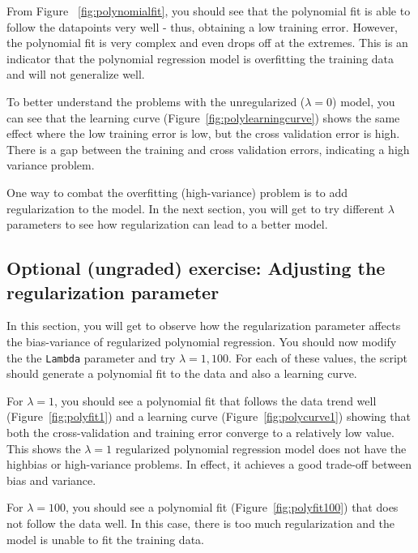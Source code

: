 \documentclass[12pt]{article}
\begin{document}
From Figure ~\ref{fig:polynomialfit}, you should see that the polynomial fit is able to follow the datapoints very well - thus, obtaining a low training error. However, the polynomial fit is very complex and even drops off at the extremes. This is an indicator that the polynomial regression model is overfitting the training data and will not generalize well.

To better understand the problems with the unregularized ($\lambda = 0$) model, you can see that the learning curve (Figure~\ref{fig:polylearningcurve}) shows the same effect where the low training error is low, but the cross validation error is high. There
is a gap between the training and cross validation errors, indicating a high
variance problem.

One way to combat the overfitting (high-variance) problem is to add regularization to the model. In the next section, you will get to try different $\lambda$ parameters to see how regularization can lead to a better model.

\subsection{Optional (ungraded) exercise: Adjusting the regularization parameter}

In this section, you will get to observe how the regularization parameter affects the bias-variance of regularized polynomial regression. You should now modify the the \texttt{Lambda} parameter and try $\lambda = 1, 100$. For each of these values, the script should generate a polynomial fit to the data and also a learning curve.

For $\lambda = 1$, you should see a polynomial fit that follows the data trend well (Figure~\ref{fig:polyfit1}) and a learning curve (Figure~\ref{fig:polycurve1}) showing that both the cross-validation and training error converge to a relatively low value. This shows the $\lambda = 1$ regularized polynomial regression model does not have the highbias or high-variance problems. In effect, it achieves a good trade-off between bias and variance.

For $\lambda = 100$, you should see a polynomial fit (Figure~\ref{fig:polyfit100}) that does not follow the data well. In this case, there is too much regularization and the model is unable to fit the training data.
\end{document}
